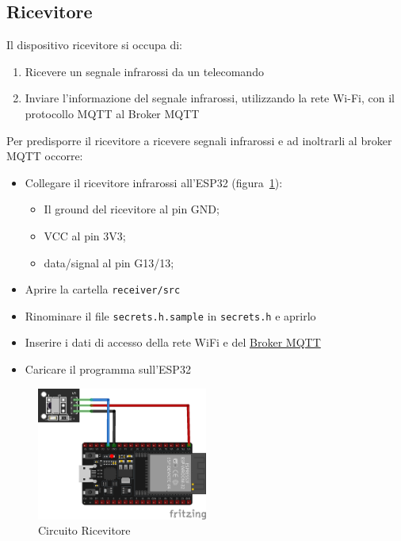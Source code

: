 \documentclass[a4paper,11pt]{article}
\begin{document}
    \subsection{Ricevitore}
    \label{subsec:receiver}

    Il dispositivo ricevitore si occupa di:

    \begin{enumerate}
      \item Ricevere un segnale infrarossi da un telecomando
      \item Inviare l'informazione del segnale infrarossi, utilizzando la rete Wi-Fi, con il protocollo MQTT al Broker MQTT
    \end{enumerate}

    Per predisporre il ricevitore a ricevere segnali infrarossi e ad inoltrarli al broker MQTT occorre:

    \begin{itemize}
      \item Collegare il ricevitore infrarossi all'ESP32 (figura~\ref{fig:circuito_ricevitore}):
        \begin{itemize}
          \item Il ground del ricevitore al pin GND;
          \item VCC al pin 3V3;
          \item data/signal al pin G13/13;
        \end{itemize}


      \item Aprire la cartella \texttt{receiver/src}
      \item Rinominare il file \texttt{secrets.h.sample} in \texttt{secrets.h} e aprirlo
      \item Inserire i dati di accesso della rete WiFi e del \hyperref[subsec:Broker]{Broker MQTT}
      \item Caricare il programma sull'ESP32
    \end{itemize}

    \begin{figure}[H]
      \centering
      \includegraphics[width=0.5\textwidth,height=\textheight,keepaspectratio]{assets/receiver_fritzing}
      \caption{Circuito Ricevitore}
      \label{fig:circuito_ricevitore}
    \end{figure}
\end{document}
